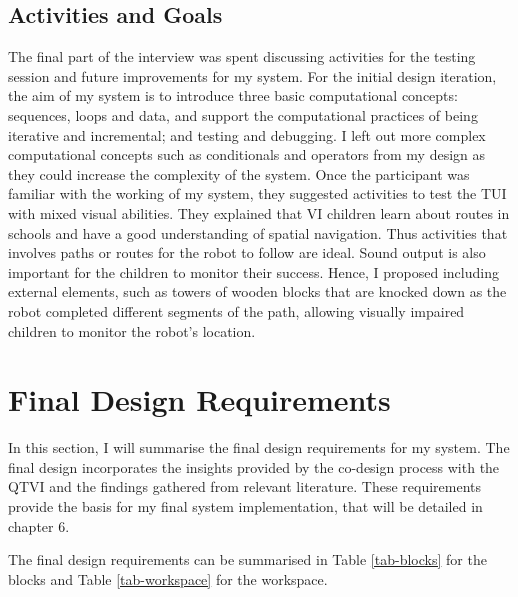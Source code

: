 \documentclass[oneside,%
                    author={Malak Hajji},
                    degree={BSc},
                    title={Designing An Accessible Computational Toolkit For Students},
                  subtitle={With Mixed Visual Abilities}]{dissertation}
\begin{document}
\subsection{Activities and Goals}
The final part of the interview was spent discussing activities for the testing session and future improvements for my system. For the initial design iteration, the aim of my system is to introduce three basic computational concepts: sequences, loops and data, and support the computational practices of being iterative and incremental; and testing and debugging. I left out more complex computational concepts such as conditionals and operators from my design as they could increase the complexity of the system. 
Once the participant was familiar with the working of my system, they suggested activities to test the TUI with mixed visual abilities. They explained that VI children learn about routes in schools and have a good understanding of spatial navigation. Thus activities that involves paths or routes for the robot to follow are ideal. Sound output is also important for the children to monitor their success. Hence, I proposed including external elements, such as towers of wooden blocks that are knocked down as the robot completed different segments of the path, allowing visually impaired children to monitor the robot's location.

\section{Final Design Requirements}
In this section, I will summarise the final design requirements for my system. The final design incorporates the insights provided by the co-design process with the QTVI and the findings gathered from relevant literature. These  requirements provide the basis for my final system implementation, that will be detailed in chapter 6.

The final design requirements can be summarised in Table \ref{tab-blocks} for the blocks and Table \ref{tab-workspace} for the workspace.
\end{document}
